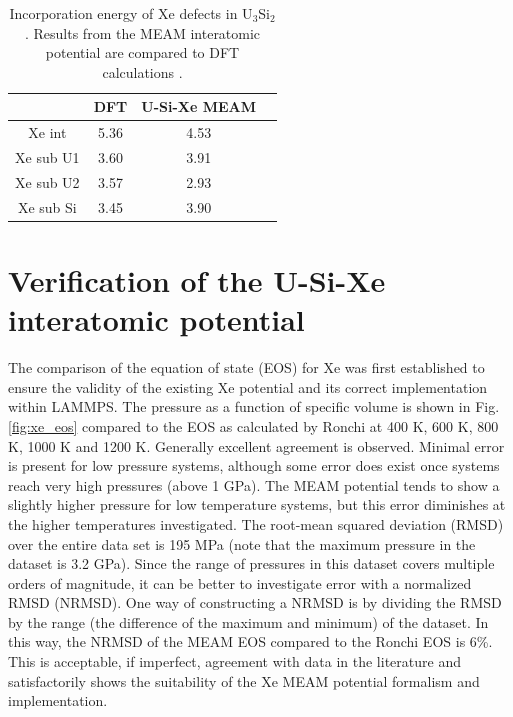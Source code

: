 \documentclass[review]{elsarticle}
\begin{document}
\begin{table}[h]
\caption{Incorporation energy of Xe defects in U$_3$Si$_2$. Results from the MEAM interatomic potential are compared to DFT calculations \cite{andersson2018}. }\label{tab:xeinc}
\begin{center}
\begin{tabular}{|c|c|c|c|}
 \hline
 & DFT & U-Si-Xe MEAM \\
 \hline
 Xe int & 5.36 & 4.53 \\ 
 Xe sub U1 & 3.60 & 3.91 \\ 
 Xe sub U2 & 3.57 & 2.93 \\ 
 Xe sub Si & 3.45 & 3.90 \\ 
 \hline
\end{tabular}
\end{center}
\label{default}
\end{table}%

\FloatBarrier

\section{Verification of the U-Si-Xe interatomic potential}

The comparison of the equation of state (EOS) for Xe was first established to ensure the validity of the existing Xe potential and its correct implementation within LAMMPS. The pressure as a function of specific volume is shown in Fig. \ref{fig:xe_eos} compared to the EOS as calculated by Ronchi \cite{ronchi1981} at 400 K, 600 K, 800 K, 1000 K and 1200 K. Generally excellent agreement is observed. Minimal error is present for low pressure systems, although some error does exist once systems reach very high pressures (above 1 GPa). The MEAM potential tends to show a slightly higher pressure for low temperature systems, but this error diminishes at the higher temperatures investigated. The root-mean squared deviation (RMSD) over the entire data set is 195 MPa (note that the maximum pressure in the dataset is 3.2 GPa). Since the range of pressures in this dataset covers multiple orders of magnitude, it can be better to investigate error with a normalized RMSD (NRMSD). One way of constructing a NRMSD is by dividing the RMSD by the range (the difference of the maximum and minimum) of the dataset. In this way, the NRMSD of the MEAM EOS compared to the Ronchi EOS is 6\%. This is acceptable, if imperfect, agreement with data in the literature and satisfactorily shows the suitability of the Xe MEAM potential formalism and implementation. 
\end{document}
